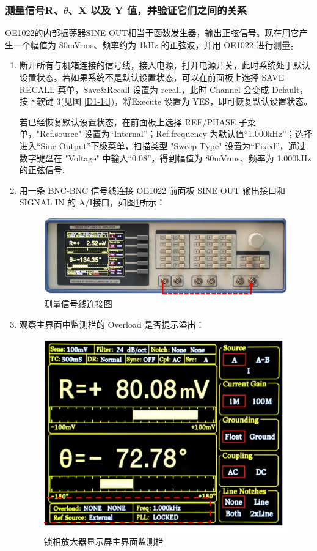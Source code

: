 \documentclass[11pt,a4paper]{ctexart}
\begin{document}
	\subsubsection{测量信号R、$\theta$、X 以及 Y 值，并验证它们之间的关系}
	OE1022的内部振荡器SINE OUT相当于函数发生器，输出正弦信号。现在用它产生一个幅值为 80mVrms、频率约为 1kHz 的正弦波，并用 OE1022 进行测量。
\begin{enumerate}[(1)]
\item  断开所有与机箱连接的信号线，接入电源，打开电源开关，此时系统处于默认设置状态。若如果系统不是默认设置状态，可以在前面板上选择 SAVE RECALL 菜单，Save\&Recall 设置为 recall，此时 Channel 会变成 Default，按下软键 3(见图 \ref{D1-14})，将Execute 设置为 YES，即可恢复默认设置状态。
		
若已经恢复默认设置状态，在前面板上选择 REF/PHASE 子菜单，"Ref.source" 设置为“Internal”；Ref.frequency 为默认值“1.000kHz”；选择进入“Sine Output”下级菜单，扫描类型 "Sweep Type" 设置为“Fixed”，通过数字键盘在 "Voltage" 中输入“0.08”，得到幅值为 80mVrms、频率为 1.000kHz 的正弦信号.
		
\item 用一条 BNC-BNC 信号线连接 OE1022 前面板 SINE OUT 输出接口和 SIGNAL IN 的 A/I接口，如图\ref{D1-12}所示：
		\begin{figure}[H]
			\centering
			\includegraphics[scale=0.5]{D1-12}
			\caption{测量信号线连接图}\label{D1-12}
		\end{figure}
		
		\item 观察主界面中监测栏的 Overload 是否提示溢出：
		\begin{figure}[H]
			\centering
			\includegraphics[scale=0.5]{D1-13}
			\caption{锁相放大器显示屏主界面监测栏}\label{D1-13}
		\end{figure}
	

\end{enumerate}
\end{document}
